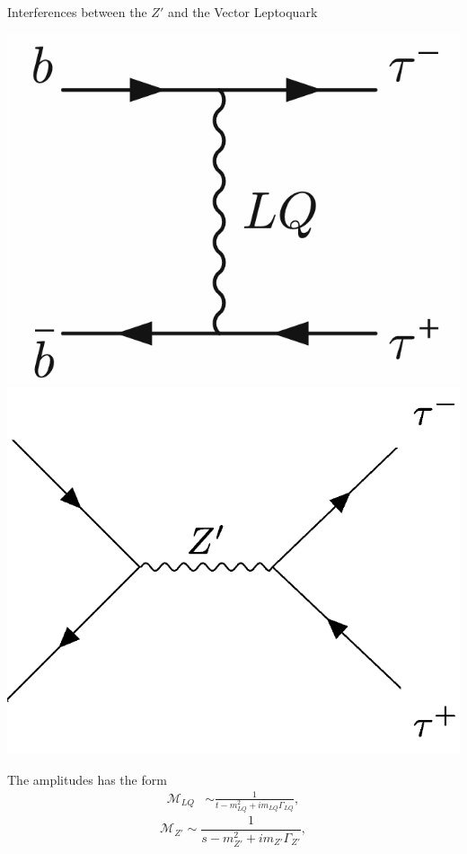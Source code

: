 \documentclass{../bredelebeamer}
\begin{document}
\begin{frame}{Interferences between the $Z'$ and the Vector Leptoquark}

    \begin{minipage}{.45\linewidth}
		\begin{center}
            \includegraphics[width=.62\linewidth]{../2023_paper/non_resonant.png}
			\includegraphics[width=.6\linewidth]{../2023_paper/Zp.png}
		\end{center}
	\end{minipage}	
	\begin{minipage}{.53\linewidth}
		The amplitudes has the form 
        \begin{align*}
            \mathcal{M}_{LQ} &\sim \frac{1}{t-m_{LQ}^2 + i m_{LQ} \Gamma_{LQ}},
        \end{align*}
        \begin{equation*}
            \mathcal{M}_{Z'} \sim \frac{1}{s-m_{Z'}^2 + i m_{Z'} \Gamma_{Z'}},

\end{equation*}
\end{minipage}
\end{frame}
\end{document}
